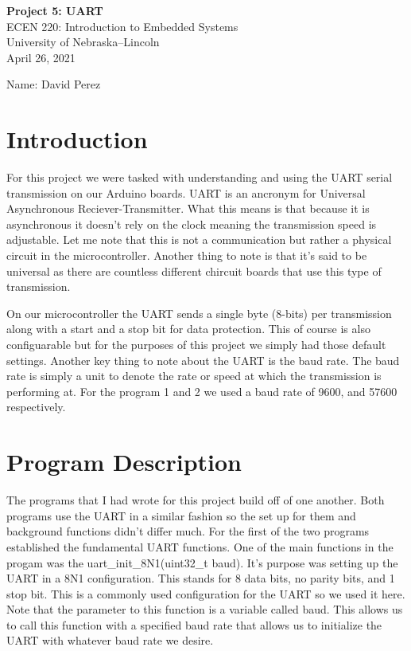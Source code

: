 \documentclass[11pt,pdftex,portrait,letterpaper]{article}
\begin{document}
	
	\vspace*{30ex}
	\begin{center}
		
		\textbf{Project 5: UART}\\
		
		\vspace{4ex}
		ECEN 220: Introduction to Embedded Systems\\
		University of Nebraska--Lincoln\\
		April 26, 2021
		
		\vspace{4ex}
		Name: David Perez\\
		
	\end{center}
	
	
	\pagebreak
	\tableofcontents
	\pagebreak
	
	
	\section{Introduction}
	
	For this project we were tasked with understanding and using the UART serial transmission on our Arduino boards. UART is an ancronym for Universal Asynchronous Reciever-Transmitter. What this means is that because it is asynchronous it doesn't rely on the clock meaning the transmission speed is adjustable. Let me note that this is not a communication but rather a physical circuit in the microcontroller. Another thing to note is that it's said to be universal as there are countless different chircuit boards that use this type of transmission.
	
	On our microcontroller the UART sends a single byte (8-bits) per transmission along with a start and a  stop bit for data protection. This of course is also configuarable but for the purposes of this project we simply had those default settings. Another key thing to note about the UART is the baud rate. The baud rate is simply a unit to denote the rate or speed at which the transmission is performing at. For the program 1 and 2 we used a baud rate of 9600, and 57600 respectively. 
	
	\section{Program Description}

	
	The programs that I had wrote for this project build off of one another. Both programs use the UART in a similar fashion so the set up for them and background functions didn't differ much. For the first of the two programs established the fundamental UART functions. One of the main functions in the progam was the uart\_init\_8N1(uint32\_t baud). It's purpose was setting up the UART in a 8N1 configuration. This stands for 8 data bits, no parity bits, and 1 stop bit. This is a commonly used configuration for the UART so we used it here. Note that the parameter to this function is a variable called baud. This allows us to call this function with a specified baud rate that allows us to initialize the UART with whatever baud rate we desire.
	
\end{document}

